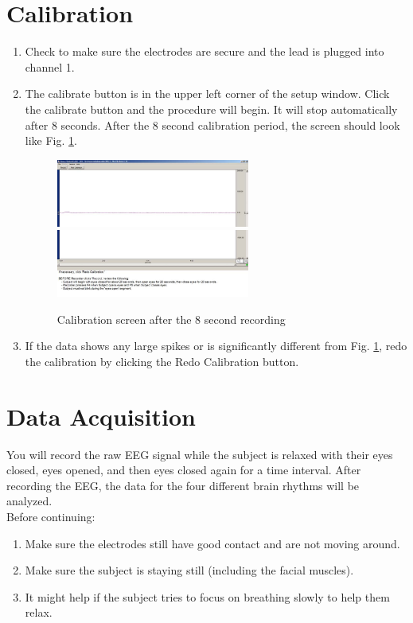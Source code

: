\documentclass{article}
\begin{document}
\section*{Calibration}
\begin{enumerate}
	\item Check to make sure the electrodes are secure and the lead is plugged into channel 1.
	\item The calibrate button is in the upper left corner of the setup window. Click the calibrate button and the procedure will begin. It will stop automatically after 8 seconds. After the 8 second calibration period, the screen should look like Fig. \ref{calibration}.
	
		\begin{figure}[h]
	\centering\includegraphics[width=0.6\textwidth]{../images/EEG_6a.jpg}
	\centering\includegraphics[width=0.6\textwidth]{../images/EEG_6b.jpg}	
		\caption{Calibration screen after the 8 second recording}
		\label{calibration}
		\end{figure}
	
	\item If the data shows any large spikes or is significantly different from Fig. \ref{calibration}, redo the calibration by clicking the Redo Calibration button.
\end{enumerate}

\section*{Data Acquisition}
You will record the raw EEG signal while the subject is relaxed with their eyes closed, eyes opened, and then eyes closed again for a time interval. After recording the EEG, the data for the four different brain rhythms will be analyzed.\\

Before continuing:
\begin{enumerate}
	\item Make sure the electrodes still have good contact and are not moving around.
	\item Make sure the subject is staying still (including the facial muscles).
	\item It might help if the subject tries to focus on breathing slowly to help them relax.
\end{enumerate}
\end{document}
